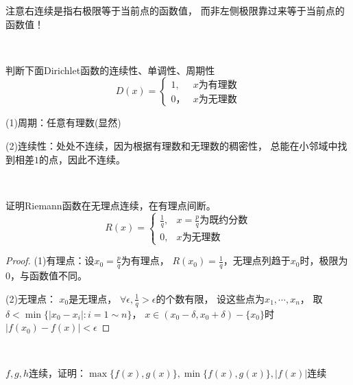 \begin{note}
  注意右连续是指右极限等于当前点的函数值，
  而非左侧极限靠过来等于当前点的函数值！
\end{note}

~

\begin{exercise}[Dirichlet函数的连续性]
  判断下面Dirichlet函数的连续性、单调性、周期性
  \begin{equation*}
    D(x) =
    \begin{cases}
      1, &x \text{为有理数}\\
      0， &x \text{为无理数}
    \end{cases}
  \end{equation*}
\end{exercise}

\begin{solution}
  (1)周期：任意有理数(显然)

  (2)连续性：处处不连续，因为根据有理数和无理数的稠密性，
  总能在小邻域中找到相差$1$的点，因此不连续。
\end{solution}

~

\begin{exercise}[Riemann函数的连续性]
  证明Riemann函数在无理点连续，在有理点间断。
  \begin{equation*}
    R(x) =
    \begin{cases}
      \frac{1}{q}, & x = \frac{p}{q}\text{为既约分数}\\
      0, & x\text{为无理数}
    \end{cases}
  \end{equation*}
\end{exercise}

\begin{proof}
  (1)有理点：设$x_0 = \frac{p}{q}$为有理点，
  $R(x_0) = \frac{1}{q}$，无理点列趋于$x_0$时，极限为$0$，与函数值不同。

  (2)无理点：
  $x_0$是无理点，
  $\forall \epsilon, \frac{1}{q} > \epsilon$的个数有限，
  设这些点为$x_1,\cdots,x_n$，
  取$\delta < \min\{|x_0 - x_i|: i = 1\sim n\}$，
  $x \in (x_0 - \delta, x_0 + \delta) - \{x_0\}$时
  $|f(x_0) - f(x)| < \epsilon$
\end{proof}

~

\begin{exercise}[初等函数的连续性]
  $f,g,h$连续，证明：$\max \{f(x),g(x)\}, \min \{f(x),g(x)\}, |f(x)|$连续
\end{exercise}

